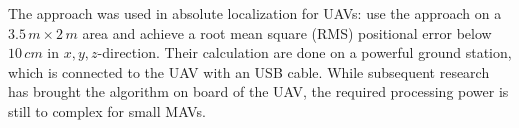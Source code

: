 The approach was used in absolute localization for UAVs: \citet{blosch2010} use the approach on a $3.5\,m \times 2\,m$ area and achieve a root mean square (RMS) positional error below $10\,cm$ in $x,y,z$-direction. Their calculation are done on a powerful ground station, which is connected to the UAV with an USB cable. While subsequent research has brought the algorithm on board of the UAV, the required processing power is still to complex for small MAVs.  